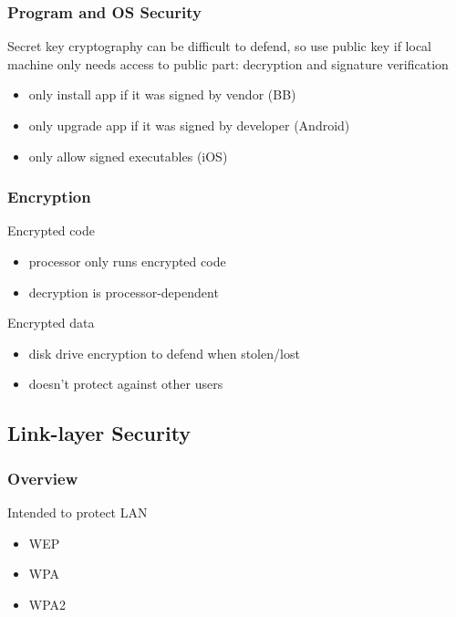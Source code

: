 \documentclass[]{article}
\theoremstyle{definition}
\begin{document}
	\subsubsection{Program and OS Security}
	Secret key cryptography can be difficult to defend, so use public key if local machine only needs access to public part: decryption and signature verification
	\begin{itemize}
		\item only install app if it was signed by vendor (BB)
		\item only upgrade app if it was signed by developer (Android)
		\item only allow signed executables (iOS)
	\end{itemize}
	\subsubsection{Encryption}
	Encrypted code
	\begin{itemize}
		\item processor only runs encrypted code
		\item decryption is processor-dependent
	\end{itemize}
	Encrypted data
	\begin{itemize}
		\item disk drive encryption to defend when stolen/lost
		\item doesn't protect against other users
	\end{itemize}

	\subsection{Link-layer Security}
	\subsubsection{Overview}
	Intended to protect LAN
	\begin{itemize}
		\item WEP
		\item WPA
		\item WPA2
	\end{itemize}
\end{document}
